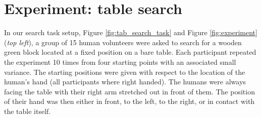 
\section{Experiment: table search}\label{ch3:experiment}

In our search task setup, Figure \ref{fig:tab_search_task} and  Figure \ref{fig:experiment} (\textit{top left}), 
a group of 15 human volunteers were asked to search for a wooden green block located at a fixed position on a bare table. 
Each participant repeated the experiment 10 times from four starting points with an associated small variance. 
The starting positions were given with respect to the location of the human's hand (all participants where right handed). The humans were always facing the table with their right 
arm stretched out in front of them. The  position of their hand was then either in front, to the left, to the right, or in contact with the table itself. 

